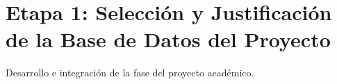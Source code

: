 \section{Etapa 1: Selección y Justificación de la Base de Datos del Proyecto}
Desarrollo e integración de la fase del proyecto académico.
